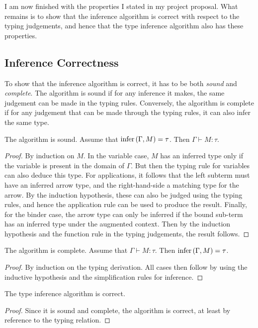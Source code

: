I am now finished with the properties I stated in my project proposal.
What remains is to show that the inference algorithm is correct with respect to the typing judgements, and hence that the type inference algorithm also has these properties.

\subsection{Inference Correctness}
\label{sec:correctness}
To show that the inference algorithm is correct, it has to be both \emph{sound} and \emph{complete}.
The algorithm is sound if for any inference it makes, the same judgement can be made in the typing rules.
Conversely, the algorithm is complete if for any judgement that can be made through the typing rules, it can also infer the same type.

\begin{lemma}
The algorithm is sound.
Assume that \(\mathrm{infer}\left(\Gamma, M\right) = \tau\).
Then \(\Gamma \vdash M : \tau\).
\end{lemma}
\begin{proof}
By induction on \(M\).
In the variable case, \(M\) has an inferred type only if the variable is present in the domain of \(\Gamma\).
But then the typing rule for variables can also deduce this type.
For applications, it follows that the left subterm must have an inferred arrow type, and the right-hand-side a matching type for the arrow.
By the induction hypothesis, these can also be judged using the typing rules, and hence the application rule can be used to produce the result.
Finally, for the binder case, the arrow type can only be inferred if the bound sub-term has an inferred type under the augmented context.
Then by the induction hypothesis and the function rule in the typing judgements, the result follows.
\end{proof}

\begin{lemma}
The algorithm is complete.
Assume that \(\Gamma \vdash M : \tau\).
Then \(\mathrm{infer}\left(\Gamma, M\right) = \tau\).
\end{lemma}
\begin{proof}
By induction on the typing derivation.
All cases then follow by using the inductive hypothesis and the simplification rules for inference.
\end{proof}

\begin{theorem}
The type inference algorithm is correct.
\end{theorem}
\begin{proof}
Since it is sound and complete, the algorithm is correct, at least by reference to the typing relation.
\end{proof}

